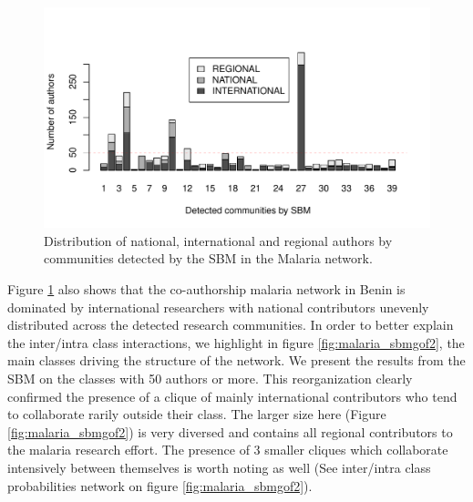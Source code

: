 \begin{figure}[!ht]
\centering
\includegraphics[scale=0.75]{Chapters/malaria/statMod/unnamed-chunk-2-1}
\caption{Distribution of national, international and regional authors by communities detected by the SBM in the Malaria network.}
\label{fig:malaria_dist}
\end{figure}

Figure \ref{fig:malaria_dist} also shows that the co-authorship malaria network in Benin is dominated by international researchers with national contributors unevenly distributed across the detected research communities. In order to better explain the inter/intra class interactions, we highlight in figure \ref{fig:malaria_sbmgof2}, the main classes driving the structure of the network. We present the results from the SBM on the classes with 50 authors or more. This reorganization clearly confirmed the presence of a clique of mainly international contributors who tend to collaborate rarily outside their class. The larger size here (Figure \ref{fig:malaria_sbmgof2}) is very diversed and contains all regional contributors to the malaria research effort. The presence of 3 smaller cliques which collaborate intensively between themselves is worth noting as well (See inter/intra class probabilities network on figure \ref{fig:malaria_sbmgof2}).


